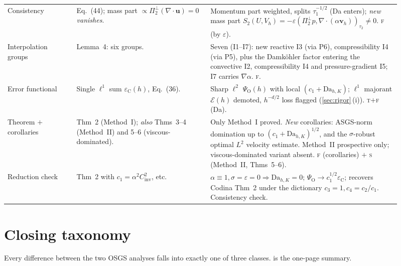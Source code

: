 \documentclass[11pt]{article}
\theoremstyle{remark}
\newcommand{\bu}{\boldsymbol{u}}
\newcommand{\bv}{\boldsymbol{v}}
\newcommand{\Dah}{\mathrm{Da}_{h,K}}
\newcommand{\Ptwoo}{\Pi_{2}^{\perp}}
\newcommand{\forced}{\textsc{f}\xspace}   %
\newcommand{\tight}{\textsc{t}\xspace}    %
\newcommand{\scope}{\textsc{s}\xspace}    %
\begin{document}
\begin{small}
\begin{longtable}{@{}p{0.16\linewidth}p{0.31\linewidth}p{0.44\linewidth}@{}}
Consistency &
Eq.~(44); mass part $\propto\Ptwoo(\nabla\cdot\bu)=0$ \emph{vanishes}. &
Momentum part weighted, splits $\tau_1^{-1/2}$ (Da enters); \emph{new} mass part
$S_2(U,V_h)=-\varepsilon(\Ptwoo p,\nabla\cdot(\alpha\bv_h))_{\tau_2}\neq0$. \forced{} (by $\varepsilon$). \\

Interpolation groups &
Lemma~4: six groups. &
Seven (I1--I7): new reactive I3 (via P6), compressibility I4 (via P5), plus the Damk\"ohler
factor entering the convective I2, compressibility I4 and pressure-gradient I5; I7 carries
$\nabla\alpha$. \forced. \\

Error functional &
Single $\ell^1$ sum $\varepsilon_{\mathrm C}(h)$, Eq.~(36). &
Sharp $\ell^2$ $\Psi_{\mathrm O}(h)$ with local $(c_1+\Dah)$; $\ell^1$ majorant $\mathcal E(h)$
demoted, $h^{-d/2}$ loss flagged (\cref{sec:rigor}\,(i)). \tight{}$+$\forced{} (Da). \\

Theorem $+$ corollaries &
Thm~2 (Method~I); \emph{also} Thms~3--4 (Method~II) and 5--6 (viscous-dominated). &
Only Method~I proved. \emph{New} corollaries: ASGS-norm domination up to $(c_1+\Dah)^{1/2}$,
and the $\sigma$-robust optimal $L^2$ velocity estimate. Method~II prospective only;
viscous-dominated variant absent. \forced{} (corollaries) $+$ \scope{} (Method~II, Thms~5--6). \\

Reduction check &
Thm~2 with $c_1{=}\alpha^2C_{\mathrm{inv}}^2$, etc. &
$\alpha\equiv1,\sigma{=}\varepsilon{=}0\Rightarrow\Dah{=}0$; $\Psi_{\mathrm O}\to c_1^{1/2}\varepsilon_{\mathrm C}$;
recovers Codina Thm~2 under the dictionary $c_3=1,c_4=c_2/c_1$. Consistency check. \\
\end{longtable}
\end{small}

\section{Closing taxonomy}
\label{sec:taxonomy}

Every difference between the two OSGS analyses falls into exactly one of three classes.
 is the one-page summary.
\end{document}

